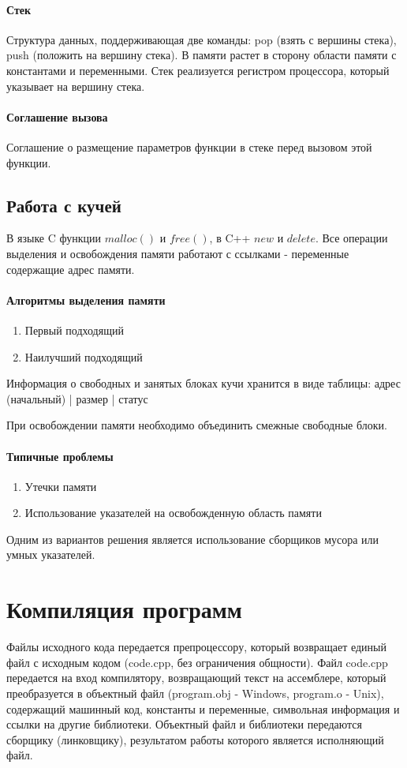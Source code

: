 \documentclass[]{article}
\begin{document}
		\paragraph{Стек}
		Структура данных, поддерживающая две команды: pop (взять с вершины стека), push (положить на вершину стека). В памяти растет в сторону области памяти с константами и переменными. Стек реализуется регистром процессора, который указывает на вершину стека.
		
		\paragraph{Соглашение вызова} Соглашение о размещение параметров функции в стеке перед вызовом этой функции.
	\subsection{Работа с кучей}
		В языке C функции $malloc()$ и $free()$, в C++ $new$ и $delete$. Все операции выделения и освобождения памяти работают с ссылками - переменные содержащие адрес памяти.
	
		\paragraph{Алгоритмы выделения памяти}
		\begin{enumerate}
			\item Первый подходящий
			\item Наилучший подходящий
		\end{enumerate}
		
		Информация о свободных и занятых блоках кучи хранится в виде таблицы: адрес (начальный) | размер | статус
		
		При освобождении памяти необходимо объединить смежные свободные блоки.
		
		\paragraph{Типичные проблемы}
		\begin{enumerate}
			\item Утечки памяти
			\item Использование указателей на освобожденную область памяти
		\end{enumerate}
		Одним из вариантов решения является использование сборщиков мусора или умных указателей.
	\section{Компиляция программ}
		Файлы исходного кода передается препроцессору, который возвращает единый файл с исходным кодом (code.cpp, без ограничения общности). Файл code.cpp передается на вход компилятору, возвращающий текст на ассемблере, который преобразуется в объектный файл (program.obj - Windows, program.o - Unix), содержащий машинный код, константы и переменные, символьная информация и ссылки на другие библиотеки. Объектный файл и библиотеки передаются сборщику (линковщику), результатом работы которого является исполняющий файл.
		
\end{document}
